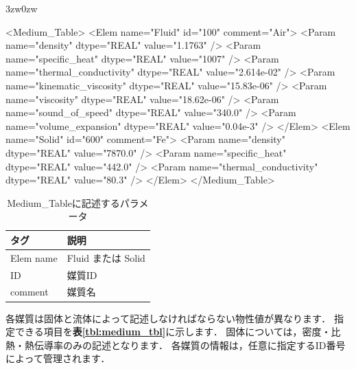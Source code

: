 \begin{indentation}{3zw}{0zw}

{\small
\begin{program}
<Medium_Table>
  <Elem name="Fluid" id="100" comment="Air">
    <Param name="density"              dtype="REAL" value="1.1763" />
    <Param name="specific_heat"        dtype="REAL" value="1007" />
    <Param name="thermal_conductivity" dtype="REAL" value="2.614e-02" />
    <Param name="kinematic_viscosity"  dtype="REAL" value="15.83e-06" />
    <Param name="viscosity"            dtype="REAL" value="18.62e-06" />
    <Param name="sound_of_speed"       dtype="REAL" value="340.0" />
    <Param name="volume_expansion"     dtype="REAL" value="0.04e-3" />
  </Elem>
  <Elem name="Solid" id="600" comment="Fe">
    <Param name="density"              dtype="REAL" value="7870.0" />
    <Param name="specific_heat"        dtype="REAL" value="442.0" />
    <Param name="thermal_conductivity" dtype="REAL" value="80.3" />
  </Elem>
</Medium_Table>
\end{program}
}

\begin{table}[htdp]
\caption{Medium\_Tableに記述するパラメータ}
\begin{center}
\begin{tabular}{ll} \toprule
タグ & 説明\\ \midrule
Elem name & Fluid または Solid\\
ID & 媒質ID\\
comment & 媒質名\\ \bottomrule
\end{tabular}
\end{center}
\label{tbl:MTLentry}
\end{table}


各媒質は固体と流体によって記述しなければならない物性値が異なります．
指定できる項目を\textbf{表\ref{tbl:medium_tbl}}に示します．
固体については，密度・比熱・熱伝導率のみの記述となります．
各媒質の情報は，任意に指定するID番号によって管理されます．


\end{indentation}
